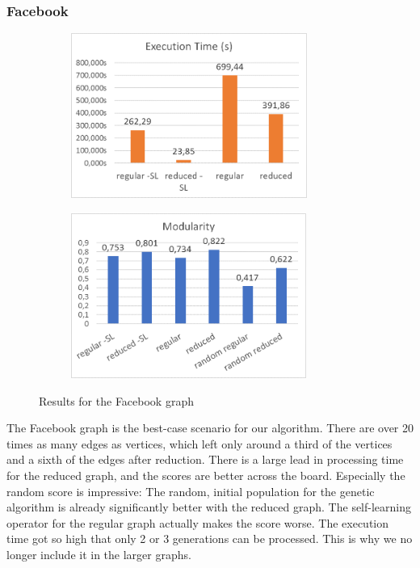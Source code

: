 \subsubsection{Facebook}
\begin{figure}[H]
\begin{center}
    \begin{subfigure}{0.47\textwidth}
    \begin{center}
    \includegraphics[height=5.4cm]{images/facebooktime.png}
    \end{center}
    \end{subfigure}
    \begin{subfigure}{0.47\textwidth}
    \begin{center}
    \includegraphics[height=5.4cm]{images/facebookfitness.png}
    \end{center}
    \end{subfigure}
\caption{Results for the Facebook graph}\label{fig:facebook}
\end{center}
\end{figure}
The Facebook graph is the best-case scenario for our algorithm. There are over 20 times as many edges as vertices, which left only around a third of the vertices and a sixth of the edges after reduction. There is a large lead in processing time for the reduced graph, and the scores are better across the board. Especially the random score is impressive: The random, initial population for the genetic algorithm is already significantly better with the reduced graph. The self-learning operator for the regular graph actually makes the score worse. The execution time got so high that only 2 or 3 generations can be processed. This is why we no longer include it in the larger graphs.

